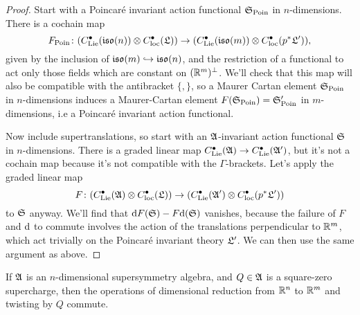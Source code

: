 \documentclass[10pt, oneside]{article}
\begin{document}
\begin{proof}
  Start with a Poincar\'e invariant action functional $\mathfrak{S}_{\mathrm{Poin}}$ in $n$-dimensions.  There is a cochain map \[F_{\mathrm{Poin}} \colon (C^\bullet_{\mathrm{Lie}}(\mathfrak{iso}(n)) \otimes C^\bullet_{\mathrm{loc}}(\mathfrak{L}))\to (C^\bullet_{\mathrm{Lie}}(\mathfrak{iso}(m)) \otimes C^\bullet_{\mathrm{loc}}(p^* \mathfrak{L}')),\] 
 given by the inclusion of $\mathfrak{iso}(m) \hookrightarrow \mathfrak{iso}(n)$, and the restriction of a functional to act only those fields which are constant on $(\mathbb R^m)^\perp$.   We'll check that this map will also be compatible with the antibracket $\{,\}$, so a Maurer Cartan element $\mathfrak{S}_{\mathrm{Poin}}$ in $n$-dimensions induces a Maurer-Cartan element $F(\mathfrak{S}_{\mathrm{Poin}}) = \mathfrak{S}'_{\mathrm{Poin}}$ in $m$-dimensions, i.e a Poincar\'e invariant action functional. 
 
 Now include supertranslations, so start with an $\mathfrak{A}$-invariant action functional $\mathfrak{S}$ in $n$-dimensions.  There is a graded linear map $C^\bullet_{\mathrm{Lie}}(\mathfrak{A}) \to C^\bullet_{\mathrm{Lie}}(\mathfrak{A}')$, but it's not a cochain map because it's not compatible with the $\Gamma$-brackets.  Let's apply the graded linear map \[F \colon (C^\bullet_{\mathrm{Lie}}(\mathfrak{A}) \otimes C^\bullet_{\mathrm{loc}}(\mathfrak{L}))\to (C^\bullet_{\mathrm{Lie}}(\mathfrak{A}') \otimes C^\bullet_{\mathrm{loc}}(p^*\mathfrak{L}'))\] to $\mathfrak{S}$ anyway.  We'll find that ${\rm d} F(\mathfrak{S}) - F {\rm d}(\mathfrak{S})$ vanishes, because the failure of $F$ and ${\rm d}$ to commute involves the action of the translations perpendicular to $\mathbb R^m$, which act trivially on the Poincar\'e invariant theory $\mathfrak{L}'$.  We can then use the same argument as above. 
\end{proof}


\begin{lemma}
If $\mathfrak{A}$ is an $n$-dimensional supersymmetry algebra, and $Q \in \mathfrak{A}$ is a square-zero supercharge, then the operations of dimensional reduction from $\mathbb R^n$ to $\mathbb R^m$ and twisting by $Q$ commute.
\end{lemma}
\end{document}
